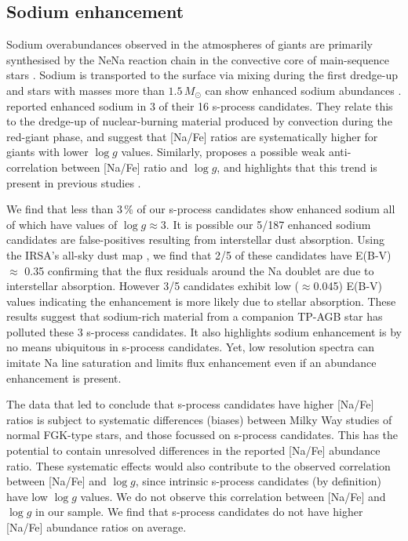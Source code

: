 \documentclass[a4paper,fleqn,usenatbib]{mnras}
\begin{document}
\subsection{Sodium enhancement}
Sodium overabundances observed in the atmospheres of giants are primarily synthesised by the NeNa reaction chain in the convective core of main-sequence stars \citep{el1995}. Sodium is transported to the surface via mixing during the first dredge-up and stars with masses more than $1.5\,M_\odot$ can show enhanced sodium abundances \citep{denissenkov1987,smiljanic2012}. \citet{antipova2004} reported  enhanced sodium in 3 of their 16 s-process candidates. They relate this to the dredge-up of nuclear-burning material produced by convection during the red-giant phase, and suggest that [Na/Fe] ratios are systematically higher for giants with lower $\log{g}$ values. Similarly, \citet{decastro2016} proposes a possible weak anti-correlation between [Na/Fe] ratio and $\log{g}$, and highlights that this trend is present in previous studies \citep[e.g.,][]{boyarchuk2002,mishenina2006,luck2007,takeda2008}.

We find that less than $3$\,\% of our s-process candidates show enhanced sodium all of which have values of $\log{g} \approx 3$. It is possible our 5/187 enhanced sodium candidates are false-positives resulting from interstellar dust absorption. Using the IRSA's all-sky dust map \citep{schlafly2011}, we find that 2/5 of these candidates have E(B-V)$\approx$ 0.35 confirming that the flux residuals around the Na doublet are due to interstellar absorption. However 3/5 candidates exhibit low ($\approx$0.045) E(B-V) values indicating the enhancement is more likely due to stellar absorption. These results suggest that sodium-rich material from a companion TP-AGB star has polluted these 3 s-process candidates. It also highlights sodium enhancement is by no means ubiquitous in s-process candidates. Yet, low resolution spectra can imitate Na line saturation and limits flux enhancement even if an abundance enhancement is present.

The data that led \citet{decastro2016} to conclude that s-process candidates have higher [Na/Fe] ratios is subject to systematic differences (biases) between Milky Way studies of normal FGK-type stars, and those focussed on s-process candidates. This has the potential to contain unresolved differences in the reported [Na/Fe] abundance ratio. These systematic effects would also contribute to the observed correlation between [Na/Fe] and $\log{g}$, since intrinsic s-process candidates (by definition) have low $\log{g}$ values. We do not observe this correlation between [Na/Fe] and $\log{g}$ in our sample. We find that s-process candidates do not have higher [Na/Fe] abundance ratios on average.
\end{document}
